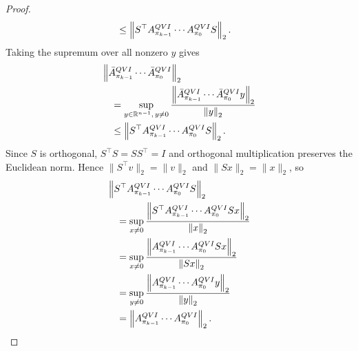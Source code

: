 \documentclass[10pt,a4paper]{amsart}
\newcommand{\R}{\mathbb{R}}
\begin{document}
\begin{proof}
\begin{align*}
  &\le
  \left\lVert
    S^\top A_{\pi_{k-1}}^{\rm QVI}\cdots A_{\pi_0}^{\rm QVI}S
  \right\rVert_2.
\end{align*}
Taking the supremum over all nonzero $y$ gives
\begin{align*}
&\left\lVert
    \bar A_{\pi_{k-1}}^{\rm QVI}\cdots \bar A_{\pi_0}^{\rm QVI}
  \right\rVert_2\\
&\quad=
  \sup_{y\in\R^{n-1},\,y\ne0}
  \frac{\left\lVert
    \bar A_{\pi_{k-1}}^{\rm QVI}\cdots \bar A_{\pi_0}^{\rm QVI}y
  \right\rVert_2}{\left\lVert y\right\rVert_2}\\
&\quad\le
  \left\lVert
    S^\top A_{\pi_{k-1}}^{\rm QVI}\cdots A_{\pi_0}^{\rm QVI}S
  \right\rVert_2.
\end{align*}
Since $S$ is orthogonal, $S^\top S=SS^\top=I$ and orthogonal multiplication
preserves the Euclidean norm. Hence $\|S^\top v\|_2=\|v\|_2$ and
$\|Sx\|_2=\|x\|_2$, so
\begin{align*}
&\left\lVert
  S^\top A_{\pi_{k-1}}^{\rm QVI}\cdots A_{\pi_0}^{\rm QVI}S
  \right\rVert_2\\
&\quad=\sup_{x\ne0}
  \frac{\left\lVert
  S^\top A_{\pi_{k-1}}^{\rm QVI}\cdots A_{\pi_0}^{\rm QVI}Sx
  \right\rVert_2}{\left\lVert x\right\rVert_2}\\
&\quad=\sup_{x\ne0}
  \frac{\left\lVert
  A_{\pi_{k-1}}^{\rm QVI}\cdots A_{\pi_0}^{\rm QVI}Sx
  \right\rVert_2}{\left\lVert Sx\right\rVert_2}\\
&\quad=\sup_{y\ne0}
  \frac{\left\lVert
  A_{\pi_{k-1}}^{\rm QVI}\cdots A_{\pi_0}^{\rm QVI}y
  \right\rVert_2}{\left\lVert y\right\rVert_2}\\
&\quad=\left\lVert A_{\pi_{k-1}}^{\rm QVI}\cdots A_{\pi_0}^{\rm QVI}\right\rVert_2.
\end{align*}
\end{proof}
\end{document}
